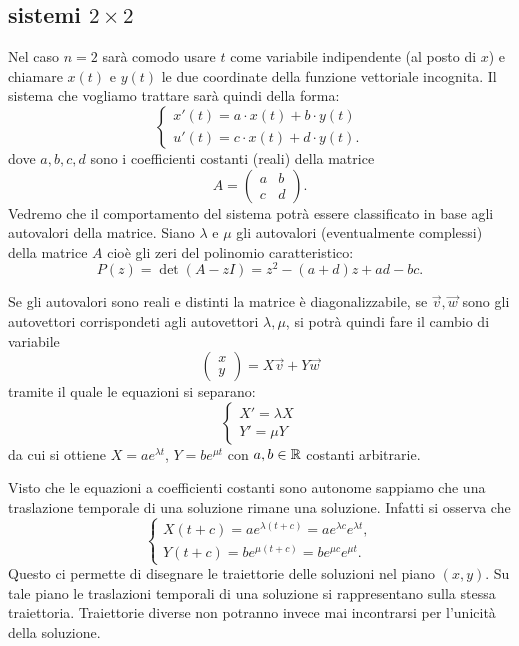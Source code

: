 \subsection{sistemi $2\times 2$}

Nel caso $n=2$ sarà comodo usare $t$ come variabile indipendente (al posto di $x$)
e chiamare $x(t)$ e $y(t)$ le due coordinate della funzione vettoriale incognita.
Il sistema che vogliamo trattare sarà quindi della forma:
\[
\begin{cases}
  x'(t) = a\cdot  x(t) + b \cdot y(t)\\
  u'(t) = c\cdot  x(t) + d \cdot y(t).
\end{cases}
\]
dove $a,b,c,d$ sono i coefficienti costanti (reali) della matrice
\[
   A = \begin{pmatrix}
   a & b \\
   c & d
   \end{pmatrix}.
\]
Vedremo che il comportamento del sistema potrà essere classificato in
base agli autovalori della matrice.
Siano $\lambda$ e $\mu$ gli autovalori (eventualmente complessi)
della matrice $A$ cioè gli zeri del polinomio caratteristico:
\[
 P(z)
 = \det (A - z I)
 = z^2 - (a+d) z + ad - bc.
\]

Se gli autovalori sono reali e distinti la matrice è
diagonalizzabile, se $\vec v, \vec w$ sono gli autovettori corrispondeti
agli autovettori $\lambda, \mu$, si potrà quindi fare il cambio
di variabile
\[
\begin{pmatrix} x \\ y \end{pmatrix}
= X \vec v + Y \vec w
\]
tramite il quale le equazioni si separano:
\[
  \begin{cases}
  X' = \lambda X \\
  Y' = \mu Y
  \end{cases}
\]
da cui si ottiene $X = a e^{\lambda t}$, $Y= b e^{\mu t}$
con $a,b\in \mathbb R$ costanti arbitrarie.

Visto che le equazioni a coefficienti costanti sono autonome
sappiamo che una traslazione temporale di una soluzione rimane
una soluzione. Infatti si osserva che
\[
\begin{cases}
  X(t+c) = a e^{\lambda (t+c)} = a e^{\lambda c} e^{\lambda t}, \\
  Y(t+c) = b e^{\mu (t+c)} = b e^{\mu c} e^{\mu t}.
\end{cases}
\]
Questo ci permette di disegnare le traiettorie delle soluzioni
nel piano $(x,y)$. Su tale piano le traslazioni temporali
di una soluzione si rappresentano sulla stessa traiettoria.
Traiettorie diverse non potranno invece mai incontrarsi
per l'unicità della soluzione.

